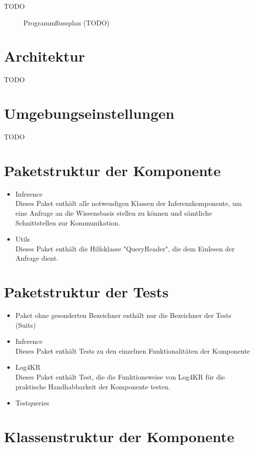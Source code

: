 \documentclass[a4paper, 11pt]{book}
\begin{document}
{TODO 

\begin{figure}[h]
	
	\caption{Programmflussplan (TODO)}
\end{figure}


\section{Architektur}
TODO

\section{Umgebungseinstellungen}
TODO

\section{Paketstruktur der Komponente}
\begin{itemize}
	\item Inference\\
	Dieses Paket enthält alle notwendigen Klassen der Inferenzkomponente, um eine Anfrage an die Wissensbasis stellen zu können und sämtliche Schnittstellen zur Kommunikation. 
	\item Utils\\
	Dieses Paket enthält die Hilfsklasse "{}QueryReader"{}, die dem Einlesen der Anfrage dient.
\end{itemize}

\section{Paketstruktur der Tests}
\begin{itemize}
	\item{Paket ohne gesonderten Bezeichner}
	enthält nur die Bezeichner der Tests (Suits)
	\item{Inference}\\
	Dieses Paket enthält Tests zu den einzelnen Funktionalitäten der Komponente
	\item{Log4KR}\\
	Dieses Paket enthält Test, die die Funktionsweise von Log4KR für die praktische Handhabbarkeit der Komponente testen.
	\item{Testqueries}
\end{itemize}

\section{Klassenstruktur der Komponente}
}
\end{document}
